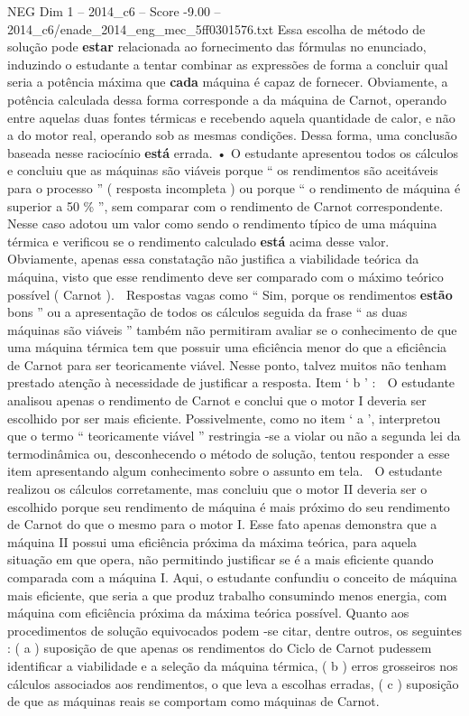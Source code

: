 \begin{textsample}{NEG Dim 1 – 2014\_c6 – Score -9.00 – 2014\_c6/enade\_2014\_eng\_mec\_5ff0301576.txt}
Essa escolha de método de solução pode \textbf{estar} relacionada ao fornecimento das fórmulas no enunciado, induzindo o estudante a tentar combinar as expressões de forma a concluir qual seria a potência máxima que \textbf{cada} máquina é capaz de fornecer.
Obviamente, a potência calculada dessa forma corresponde a da máquina de Carnot, operando entre aquelas duas fontes térmicas e recebendo aquela quantidade de calor, e não a do motor real, operando sob as mesmas condições.
Dessa forma, uma conclusão baseada nesse raciocínio \textbf{está} errada. • O estudante apresentou todos os cálculos e concluiu que as máquinas são viáveis porque “ os rendimentos são aceitáveis para o processo ” ( resposta incompleta ) ou porque “ o rendimento de máquina é superior a 50 \% ”, sem comparar com o rendimento de Carnot correspondente.
Nesse caso adotou um valor como sendo o rendimento típico de uma máquina térmica e verificou se o rendimento calculado \textbf{está} acima desse valor.
Obviamente, apenas essa constatação não justifica a viabilidade teórica da máquina, visto que esse rendimento deve ser comparado com o máximo teórico possível ( Carnot ).  Respostas vagas como “ Sim, porque os rendimentos \textbf{estão} bons ” ou a apresentação de todos os cálculos seguida da frase “ as duas máquinas são viáveis ” também não permitiram avaliar se o conhecimento de que uma máquina térmica tem que possuir uma eficiência menor do que a eficiência de Carnot para ser teoricamente viável.
Nesse ponto, talvez muitos não tenham prestado atenção à necessidade de justificar a resposta.
Item ‘ b ’ :  O estudante analisou apenas o rendimento de Carnot e conclui que o motor I deveria ser escolhido por ser mais eficiente.
Possivelmente, como no item ‘ a ’, interpretou que o termo “ teoricamente viável ” restringia -se a violar ou não a segunda lei da termodinâmica ou, desconhecendo o método de solução, tentou responder a esse item apresentando algum conhecimento sobre o assunto em tela.  O estudante realizou os cálculos corretamente, mas concluiu que o motor II deveria ser o escolhido porque seu rendimento de máquina é mais próximo do seu rendimento de Carnot do que o mesmo para o motor I.
Esse fato apenas demonstra que a máquina II possui uma eficiência próxima da máxima teórica, para aquela situação em que opera, não permitindo justificar se é a mais eficiente quando comparada com a máquina I.
Aqui, o estudante confundiu o conceito de máquina mais eficiente, que seria a que produz trabalho consumindo menos energia, com máquina com eficiência próxima da máxima teórica possível.
Quanto aos procedimentos de solução equivocados podem -se citar, dentre outros, os seguintes : ( a ) suposição de que apenas os rendimentos do Ciclo de Carnot pudessem identificar a viabilidade e a seleção da máquina térmica, ( b ) erros grosseiros nos cálculos associados aos rendimentos, o que leva a escolhas erradas, ( c ) suposição de que as máquinas reais se comportam como máquinas de Carnot.

\end{textsample}
